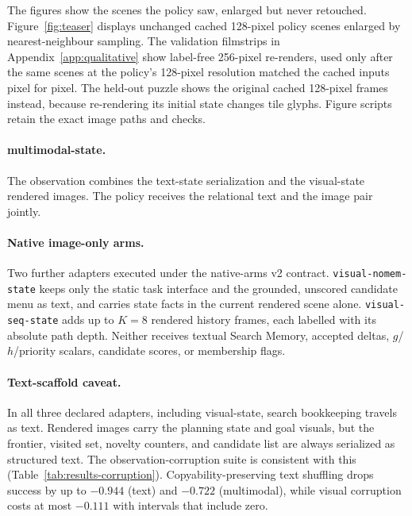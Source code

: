 The figures show the scenes the policy saw, enlarged but never retouched. Figure~\ref{fig:teaser} displays unchanged cached 128-pixel policy scenes enlarged by nearest-neighbour sampling. The validation filmstrips in Appendix~\ref{app:qualitative} show label-free 256-pixel re-renders, used only after the same scenes at the policy's 128-pixel resolution matched the cached inputs pixel for pixel. The held-out puzzle shows the original cached 128-pixel frames instead, because re-rendering its initial state changes tile glyphs. Figure scripts retain the exact image paths and checks.

\paragraph{multimodal-state.}
The observation combines the text-state serialization and the visual-state rendered images. The policy receives the relational text and the image pair jointly.

\paragraph{Native image-only arms.}
Two further adapters executed under the native-arms v2 contract. \texttt{visual-nomem-state} keeps only the static task interface and the grounded, unscored candidate menu as text, and carries state facts in the current rendered scene alone. \texttt{visual-seq-state} adds up to $K{=}8$ rendered history frames, each labelled with its absolute path depth. Neither receives textual Search Memory, accepted deltas, $g$/$h$/priority scalars, candidate scores, or membership flags.

\paragraph{Text-scaffold caveat.}
In all three declared adapters, including visual-state, search bookkeeping travels as text. Rendered images carry the planning state and goal visuals, but the frontier, visited set, novelty counters, and candidate list are always serialized as structured text. The observation-corruption suite is consistent with this (Table~\ref{tab:results-corruption}). Copyability-preserving text shuffling drops success by up to $-0.944$ (text) and $-0.722$ (multimodal), while visual corruption costs at most $-0.111$ with intervals that include zero.

